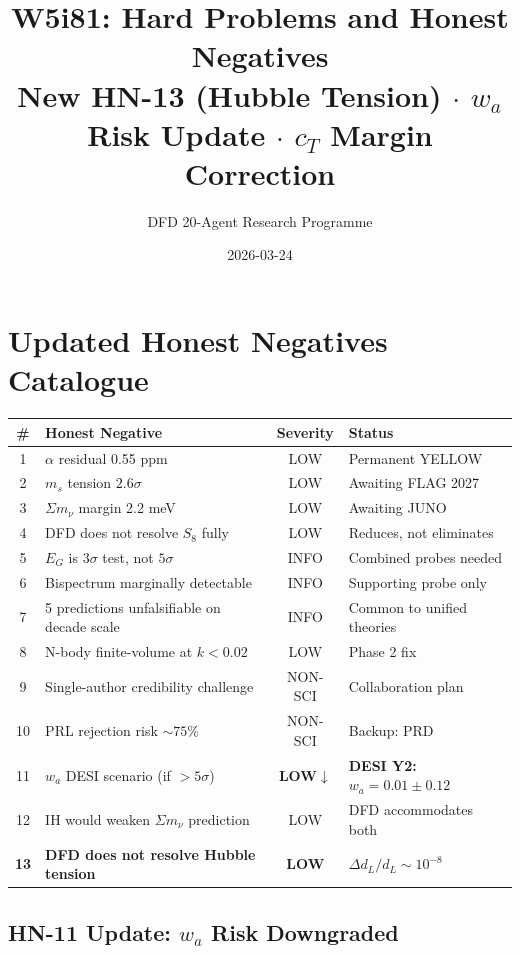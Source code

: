 \documentclass[11pt,a4paper]{article}
\title{W5i81: Hard Problems and Honest Negatives\\[6pt]
\large New HN-13 (Hubble Tension) $\cdot$ $w_a$ Risk Update $\cdot$ $c_T$ Margin Correction}
\author{DFD 20-Agent Research Programme}
\date{2026-03-24}
\begin{document}
\maketitle

\section{Updated Honest Negatives Catalogue}

\begin{center}
\begin{tabular}{clcl}
\toprule
\textbf{\#} & \textbf{Honest Negative} & \textbf{Severity} & \textbf{Status} \\
\midrule
1 & $\alpha$ residual 0.55 ppm & LOW & Permanent YELLOW \\
2 & $m_s$ tension $2.6\sigma$ & LOW & Awaiting FLAG 2027 \\
3 & $\Sigma m_\nu$ margin 2.2 meV & LOW & Awaiting JUNO \\
4 & DFD does not resolve $S_8$ fully & LOW & Reduces, not eliminates \\
5 & $E_G$ is $3\sigma$ test, not $5\sigma$ & INFO & Combined probes needed \\
6 & Bispectrum marginally detectable & INFO & Supporting probe only \\
7 & 5 predictions unfalsifiable on decade scale & INFO & Common to unified theories \\
8 & N-body finite-volume at $k < 0.02$ & LOW & Phase 2 fix \\
9 & Single-author credibility challenge & NON-SCI & Collaboration plan \\
10 & PRL rejection risk $\sim 75\%$ & NON-SCI & Backup: PRD \\
11 & $w_a$ DESI scenario (if $> 5\sigma$) & \textbf{LOW$\downarrow$} & \textbf{DESI Y2: $w_a = 0.01 \pm 0.12$} \\
12 & IH would weaken $\Sigma m_\nu$ prediction & LOW & DFD accommodates both \\
\textbf{13} & \textbf{DFD does not resolve Hubble tension} & \textbf{LOW} & \textbf{$\Delta d_L/d_L \sim 10^{-8}$} \\
\bottomrule
\end{tabular}
\end{center}

\subsection{HN-11 Update: $w_a$ Risk Downgraded}
\end{document}
